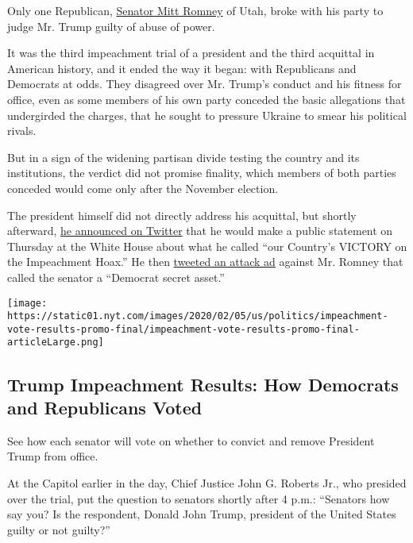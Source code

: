 Only one Republican,
\href{https://www.nytimes.com/2020/02/06/podcasts/the-daily/mitt-romney.html}{Senator
Mitt Romney} of Utah, broke with his party to judge Mr. Trump guilty of
abuse of power.

It was the third impeachment trial of a president and the third
acquittal in American history, and it ended the way it began: with
Republicans and Democrats at odds. They disagreed over Mr. Trump's
conduct and his fitness for office, even as some members of his own
party conceded the basic allegations that undergirded the charges, that
he sought to pressure Ukraine to smear his political rivals.

But in a sign of the widening partisan divide testing the country and
its institutions, the verdict did not promise finality, which members of
both parties conceded would come only after the November election.

The president himself did not directly address his acquittal, but
shortly afterward,
\href{https://twitter.com/realDonaldTrump/status/1225179058000089090}{he
announced on Twitter} that he would make a public statement on Thursday
at the White House about what he called ``our Country's VICTORY on the
Impeachment Hoax.'' He then
\href{https://twitter.com/realDonaldTrump/status/1225203837226700800}{tweeted
an attack ad} against Mr. Romney that called the senator a ``Democrat
secret asset.''

\href{https://www.nytimes.com/interactive/2020/02/05/us/politics/impeachment-vote-results.html}{}

\texttt{[image: https://static01.nyt.com/images/2020/02/05/us/politics/impeachment-vote-results-promo-final/impeachment-vote-results-promo-final-articleLarge.png]}

\hypertarget{trump-impeachment-results-how-democrats-and-republicans-voted}{%
\subsection{Trump Impeachment Results: How Democrats and Republicans
Voted}\label{trump-impeachment-results-how-democrats-and-republicans-voted}}

See how each senator will vote on whether to convict and remove
President Trump from office.

At the Capitol earlier in the day, Chief Justice John G. Roberts Jr.,
who presided over the trial, put the question to senators shortly after
4 p.m.: ``Senators how say you? Is the respondent, Donald John Trump,
president of the United States guilty or not guilty?''

